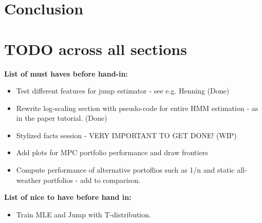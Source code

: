 \newpage

\section{Conclusion}


\section{TODO across all sections}


\textbf{List of must haves before hand-in:}

\begin{itemize}
    \item Test different features for jump estimator - see e.g. Henning (Done)
    \item Rewrite log-scaling section with pseudo-code for entire HMM estimation - as in the paper tutorial. (Done)
    \item Stylized facts session - VERY IMPORTANT TO GET DONE! (WIP)
    \item Add plots for MPC portfolio performance and draw frontiers
    \item Compute performance of alternative portoflios such as 1/n and static all-weather portfolios - add to comparison.
\end{itemize}



\textbf{List of nice to have before hand in:}

\begin{itemize}
    \item Train MLE and Jump with T-distribution.
\end{itemize}